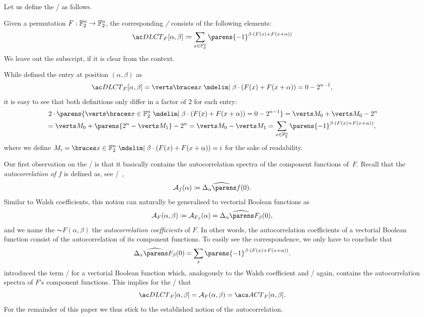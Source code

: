 Let us define the \DLCT/ as follows.
\begin{definition}[\DLCTl/]
    Given a permutation $F : \mathbb{F}_2^n \to \mathbb{F}_2^n$, the corresponding \emph{\DLCTf/} consists of the following elements:
    \begin{equation}
        \DLCT/_F[\alpha, \beta] \coloneqq
        \sum_{x \in \F_2^n} \parens{-1}^{\iprod{\beta}{(F(x) + F(x + \alpha))}}
    \end{equation}
    We leave out the subscript, if it is clear from the context.
\end{definition}
While \textcite{EPRINT:dlct19} defined the entry at position $(\alpha, \beta)$ as
\begin{equation*}
    \DLCT/_F[\alpha, \beta] = \abs{\set{x \given \iprod{\beta}{(F(x) + F(x + \alpha))} = 0}} - 2^{n-1},
\end{equation*}
it is easy to see that both definitions only differ in a factor of $2$ for each entry:
\begin{align*}
    &\ 2 \cdot \parens{\abs{\set{x \in \F_2^n \given \iprod{\beta}{(F(x) + F(x + \alpha))} = 0}} - 2^{n-1}}
     = \abs{M_0} + \abs{M_0} - 2^n \\
    &= \abs{M_0} + \parens{2^n - \abs{M_1}} - 2^n = \abs{M_0} - \abs{M_1}
     = \sum_{x \in \F_2^n} \parens{-1}^{\iprod{\beta}{(F(x) + F(x + \alpha))}},
\end{align*}
where we define $M_i = \set{x \in \F_2^n \given \iprod{\beta}{(F(x) + F(x+\alpha))} = i}$ for the sake of readability.

Our first observation on the \DLCT/ is that it basically contains the autocorrelation spectra of the component functions of~\(F\).
Recall that the \emph{autocorrelation of $f$} is defined as, see \eg/~\textcite[277]{BMM:Carlet10a},
\begin{equation*}
    \AC{f}(\alpha) \coloneqq \FC{\derive{\alpha}{f}}(0).
\end{equation*}
Similar to Walsh coefficients, this notion can naturally be generalised to vectorial Boolean functions as
\begin{equation*}
    \AC{F}(\alpha, \beta) \coloneqq \AC{F_\beta}(\alpha) = \FC{\derive{\alpha}{F_\beta}}(0),
\end{equation*}
and we name the $\AC{F}(\alpha, \beta)$ the \emph{autocorrelation coefficients} of $F$.
In other words, the autocorrelation coefficients of a vectorial Boolean function consist of the autocorrelation of its component functions.
To easily see the correspondence, we only have to conclude that
\begin{equation*}
    \FC{\derive{\alpha}{F_\beta}}(0) = \sum_{x}\parens{-1}^{\iprod{\beta}{(F(x) + F(x+\alpha))}}.
\end{equation*}
\textcite[Section~3]{DCC:ZhaZheIma00} introduced the term \ACTf/ for a vectorial Boolean function which, analogously to the Walsh coefficient and \LAT/ again, contains the autocorrelation spectra of $F$'s component functions.
This implies for the \DLCT/ that
\begin{equation*}
    \DLCT/_F[\alpha, \beta] = \AC{F}(\alpha, \beta) = \ACTs/_F[\alpha, \beta].
\end{equation*}
For the remainder of this paper we thus stick to the established notion of the autocorrelation.

